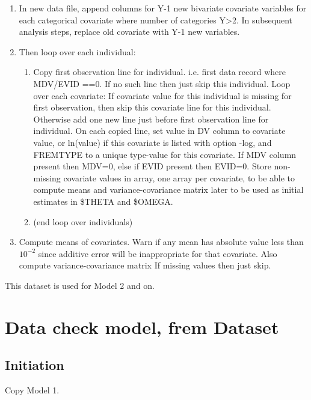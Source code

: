 \begin{enumerate}
    \item  In new data file, append columns for Y-1 new bivariate covariate variables for each
          categorical covariate where number of categories Y>2. In subsequent analysis steps, replace old covariate with
          Y-1 new variables.
\item Then loop over each individual:
\begin{enumerate}
	\item Copy first observation line for individual. i.e. first data record where MDV/EVID ==0. If no such line then just skip this individual.
Loop over each covariate:
If covariate value for this individual is missing for first observation, then skip this
covariate line for this individual. Otherwise add one %
new line %
just before first observation line for individual.
On each copied line, set value in DV column to covariate value, or ln(value) if this covariate is listed with option -log,
and FREMTYPE to a unique type-value for this covariate. %
If MDV column present then MDV=0, else if EVID present then EVID=0.%
Store non-missing covariate values in array, one array per covariate, to be able to compute means and %
variance-covariance matrix later to be used as initial estimates in \$THETA and \$OMEGA.
\item[] (end loop over individuals)
\end{enumerate}

	\item Compute means of %
    covariates. Warn if any mean %
    has absolute value less than $10^{-2}$ since additive error will be inappropriate for that covariate.
    Also compute variance-covariance matrix %
    If missing values then just skip.
\end{enumerate}

This dataset is used for Model 2 and on.

\section{Data check model, frem Dataset}
\subsection{Initiation}
Copy Model 1.


